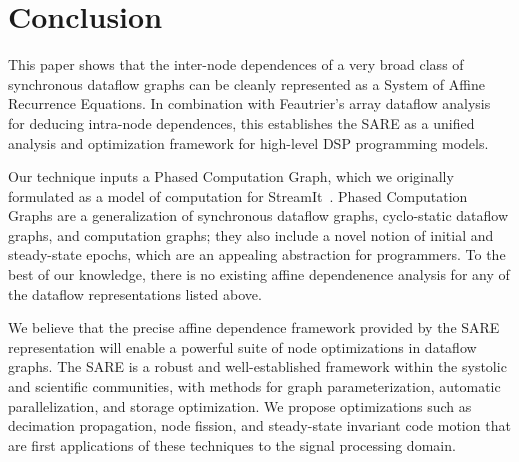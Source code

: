 \section{Conclusion}

This paper shows that the inter-node dependences of a very broad class
of synchronous dataflow graphs can be cleanly represented as a System
of Affine Recurrence Equations.  In combination with Feautrier's array
dataflow analysis~\cite{Feautrier01} for deducing intra-node
dependences, this establishes the SARE as a unified analysis and
optimization framework for high-level DSP programming models.

Our technique inputs a Phased Computation Graph, which we originally
formulated as a model of computation for StreamIt~\cite{streamitcc}.
Phased Computation Graphs are a generalization of synchronous dataflow
graphs, cyclo-static dataflow graphs, and computation graphs; they
also include a novel notion of initial and steady-state epochs, which
are an appealing abstraction for programmers.  To the best of our
knowledge, there is no existing affine dependenence analysis for any
of the dataflow representations listed above.

We believe that the precise affine dependence framework provided by
the SARE representation will enable a powerful suite of node
optimizations in dataflow graphs.  The SARE is a robust and
well-established framework within the systolic and scientific
communities, with methods for graph parameterization, automatic
parallelization, and storage optimization.  We propose optimizations
such as decimation propagation, node fission, and steady-state
invariant code motion that are first applications of these techniques
to the signal processing domain.
